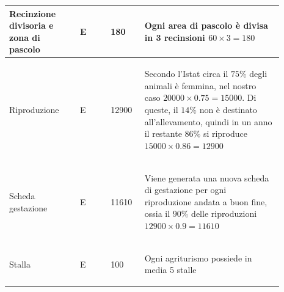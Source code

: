 \documentclass[12pt,a4paper]{article}
\begin{document}
\begin{center}
\begin{longtable}{|p{0.23\linewidth}|p{0.1\linewidth}|p{0.11\linewidth}|p{0.45\linewidth}|}
\hline
Recinzione divisoria e zona di pascolo 				& \begin{center}
\vspace{-25pt}E
\end{center}
					& \begin{center}
					\vspace{-25pt}180\end{center}
					& \begin{flushleft}\vspace{-25pt} Ogni area di pascolo è divisa in 3 recinsioni $60\times 3= 180$\end{flushleft}\\ 

\hline
Riproduzione 				& \begin{center}
\vspace{-25pt}E
\end{center}
					& \begin{center}
					\vspace{-25pt}12900\end{center}
					& \begin{flushleft}\vspace{-25pt} Secondo l'Istat circa il $75\%$ degli animali è femmina, nel nostro caso $20000\times0.75=15000$. Di queste, il $14\%$ non è destinato all'allevamento, quindi in un anno il restante $86\%$ si riproduce $15000\times 0.86=12900$ \end{flushleft}\\ 

\hline
Scheda gestazione 				& \begin{center}
\vspace{-25pt}E
\end{center}
					& \begin{center}
					\vspace{-25pt}11610\end{center}
					& \begin{flushleft}\vspace{-25pt} Viene generata una nuova scheda di gestazione per ogni riproduzione andata a buon fine, ossia il $90\%$ delle riproduzioni $12900\times 0.9= 11610$\end{flushleft}\\ 

\hline
Stalla 				& \begin{center}
\vspace{-25pt}E
\end{center}
					& \begin{center}
					\vspace{-25pt}100\end{center}
					& \begin{flushleft}\vspace{-25pt} Ogni agriturismo possiede in media 5 stalle \end{flushleft}\\ 


\end{longtable}
\end{center}
\end{document}

